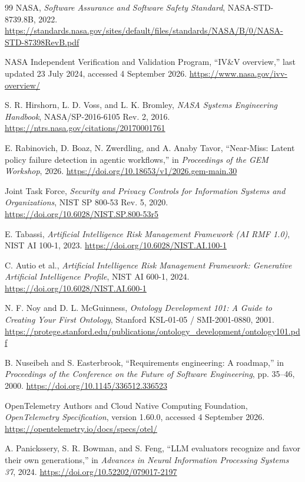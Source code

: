 \documentclass[10pt,a4paper]{article}
\begin{document}
\begin{thebibliography}{99}
NASA, \emph{Software Assurance and Software Safety Standard}, NASA-STD-8739.8B, 2022. \url{https://standards.nasa.gov/sites/default/files/standards/NASA/B/0/NASA-STD-87398RevB.pdf}

NASA Independent Verification and Validation Program, ``IV\&V overview,'' last updated 23 July 2024, accessed 4 September 2026. \url{https://www.nasa.gov/ivv-overview/}

S. R. Hirshorn, L. D. Voss, and L. K. Bromley, \emph{NASA Systems Engineering Handbook}, NASA/SP-2016-6105 Rev. 2, 2016. \url{https://ntrs.nasa.gov/citations/20170001761}

E. Rabinovich, D. Boaz, N. Zwerdling, and A. Anaby Tavor, ``Near-Miss: Latent policy failure detection in agentic workflows,'' in \emph{Proceedings of the GEM Workshop}, 2026. \url{https://doi.org/10.18653/v1/2026.gem-main.30}

Joint Task Force, \emph{Security and Privacy Controls for Information Systems and Organizations}, NIST SP 800-53 Rev. 5, 2020. \url{https://doi.org/10.6028/NIST.SP.800-53r5}

E. Tabassi, \emph{Artificial Intelligence Risk Management Framework (AI RMF 1.0)}, NIST AI 100-1, 2023. \url{https://doi.org/10.6028/NIST.AI.100-1}

C. Autio et al., \emph{Artificial Intelligence Risk Management Framework: Generative Artificial Intelligence Profile}, NIST AI 600-1, 2024. \url{https://doi.org/10.6028/NIST.AI.600-1}

N. F. Noy and D. L. McGuinness, \emph{Ontology Development 101: A Guide to Creating Your First Ontology}, Stanford KSL-01-05 / SMI-2001-0880, 2001. \url{https://protege.stanford.edu/publications/ontology_development/ontology101.pdf}

B. Nuseibeh and S. Easterbrook, ``Requirements engineering: A roadmap,'' in \emph{Proceedings of the Conference on the Future of Software Engineering}, pp. 35--46, 2000. \url{https://doi.org/10.1145/336512.336523}

OpenTelemetry Authors and Cloud Native Computing Foundation, \emph{OpenTelemetry Specification}, version 1.60.0, accessed 4 September 2026. \url{https://opentelemetry.io/docs/specs/otel/}

A. Panickssery, S. R. Bowman, and S. Feng, ``LLM evaluators recognize and favor their own generations,'' in \emph{Advances in Neural Information Processing Systems 37}, 2024. \url{https://doi.org/10.52202/079017-2197}


\end{thebibliography}
\end{document}
